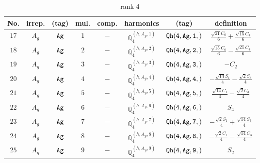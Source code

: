 \documentclass[fleqn,8pt]{jsarticle}
\begin{document}
\begin{table}[ht!]
\begin{center}
\caption{rank 4}
\renewcommand{\arraystretch}{1.3}
\begin{tabular}{cccccccc} \hline \hline
No. & irrep. & (tag) & mul. & comp. & harmonics & (tag) & definition \\ \hline
$ 17 $ & $ A_{g} $ & $ {\tt Ag} $ & $ 1 $ & $ - $ & $ \mathbb{Q}_{4}^{(h,A_{g},1)} $ & $ {\tt Qh(4,Ag,1,)} $ & $ \frac{\sqrt{21} C_{0}}{6} + \frac{\sqrt{15} C_{4}}{6} $ \\
$ 18 $ & $ A_{g} $ & $ {\tt Ag} $ & $ 2 $ & $ - $ & $ \mathbb{Q}_{4}^{(h,A_{g},2)} $ & $ {\tt Qh(4,Ag,2,)} $ & $ \frac{\sqrt{15} C_{0}}{6} - \frac{\sqrt{21} C_{4}}{6} $ \\
$ 19 $ & $ A_{g} $ & $ {\tt Ag} $ & $ 3 $ & $ - $ & $ \mathbb{Q}_{4}^{(h,A_{g},3)} $ & $ {\tt Qh(4,Ag,3,)} $ & $ - C_{2} $ \\
$ 20 $ & $ A_{g} $ & $ {\tt Ag} $ & $ 4 $ & $ - $ & $ \mathbb{Q}_{4}^{(h,A_{g},4)} $ & $ {\tt Qh(4,Ag,4,)} $ & $ - \frac{\sqrt{14} S_{1}}{4} - \frac{\sqrt{2} S_{3}}{4} $ \\
$ 21 $ & $ A_{g} $ & $ {\tt Ag} $ & $ 5 $ & $ - $ & $ \mathbb{Q}_{4}^{(h,A_{g},5)} $ & $ {\tt Qh(4,Ag,5,)} $ & $ \frac{\sqrt{14} C_{1}}{4} - \frac{\sqrt{2} C_{3}}{4} $ \\
$ 22 $ & $ A_{g} $ & $ {\tt Ag} $ & $ 6 $ & $ - $ & $ \mathbb{Q}_{4}^{(h,A_{g},6)} $ & $ {\tt Qh(4,Ag,6,)} $ & $ S_{4} $ \\
$ 23 $ & $ A_{g} $ & $ {\tt Ag} $ & $ 7 $ & $ - $ & $ \mathbb{Q}_{4}^{(h,A_{g},7)} $ & $ {\tt Qh(4,Ag,7,)} $ & $ - \frac{\sqrt{2} S_{1}}{4} + \frac{\sqrt{14} S_{3}}{4} $ \\
$ 24 $ & $ A_{g} $ & $ {\tt Ag} $ & $ 8 $ & $ - $ & $ \mathbb{Q}_{4}^{(h,A_{g},8)} $ & $ {\tt Qh(4,Ag,8,)} $ & $ - \frac{\sqrt{2} C_{1}}{4} - \frac{\sqrt{14} C_{3}}{4} $ \\
$ 25 $ & $ A_{g} $ & $ {\tt Ag} $ & $ 9 $ & $ - $ & $ \mathbb{Q}_{4}^{(h,A_{g},9)} $ & $ {\tt Qh(4,Ag,9,)} $ & $ S_{2} $ \\
 \hline \hline
\end{tabular}
\end{center}
\end{table}
\end{document}

